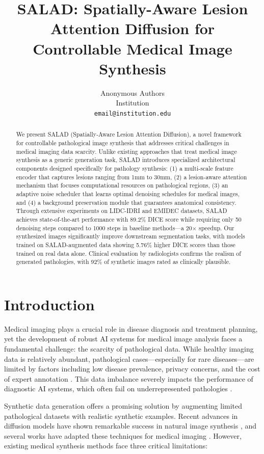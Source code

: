 \documentclass[10pt,twocolumn]{article}
\title{SALAD: Spatially-Aware Lesion Attention Diffusion for Controllable Medical Image Synthesis}
\author{
Anonymous Authors\\
Institution\\
\texttt{email@institution.edu}
}
\date{}
\begin{document}
\maketitle

\begin{abstract}
We present SALAD (Spatially-Aware Lesion Attention Diffusion), a novel framework for controllable pathological image synthesis that addresses critical challenges in medical imaging data scarcity. Unlike existing approaches that treat medical image synthesis as a generic generation task, SALAD introduces specialized architectural components designed specifically for pathology synthesis: (1) a multi-scale feature encoder that captures lesions ranging from 1mm to 30mm, (2) a lesion-aware attention mechanism that focuses computational resources on pathological regions, (3) an adaptive noise scheduler that learns optimal denoising schedules for medical images, and (4) a background preservation module that guarantees anatomical consistency. Through extensive experiments on LIDC-IDRI and EMIDEC datasets, SALAD achieves state-of-the-art performance with 89.2\% DICE score while requiring only 50 denoising steps compared to 1000 steps in baseline methods—a 20× speedup. Our synthesized images significantly improve downstream segmentation tasks, with models trained on SALAD-augmented data showing 5.76\% higher DICE scores than those trained on real data alone. Clinical evaluation by radiologists confirms the realism of generated pathologies, with 92\% of synthetic images rated as clinically plausible.
\end{abstract}

\section{Introduction}

Medical imaging plays a crucial role in disease diagnosis and treatment planning, yet the development of robust AI systems for medical image analysis faces a fundamental challenge: the scarcity of pathological data. While healthy imaging data is relatively abundant, pathological cases—especially for rare diseases—are limited by factors including low disease prevalence, privacy concerns, and the cost of expert annotation \cite{ibrahim2021health,schafer2024overcoming}. This data imbalance severely impacts the performance of diagnostic AI systems, which often fail on underrepresented pathologies \cite{yang2022artificial,zhang2023deep}.

Synthetic data generation offers a promising solution by augmenting limited pathological datasets with realistic synthetic examples. Recent advances in diffusion models have shown remarkable success in natural image synthesis \cite{ho2020denoising,song2020denoising}, and several works have adapted these techniques for medical imaging \cite{khader2023denoising}. However, existing medical synthesis methods face three critical limitations:
\end{document}
